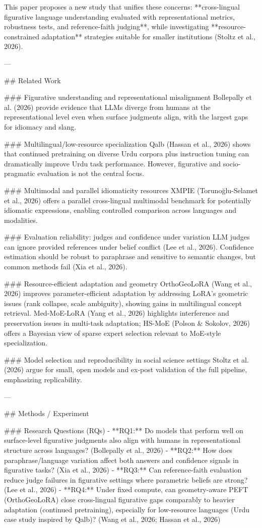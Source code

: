 This paper proposes a new study that unifies these concerns: **cross-lingual figurative language understanding evaluated with representational metrics, robustness tests, and reference-faith judging**, while investigating **resource-constrained adaptation** strategies suitable for smaller institutions (Stoltz et al., 2026).

---

## Related Work  

### Figurative understanding and representational misalignment  
Bollepally et al. (2026) provide evidence that LLMs diverge from humans at the representational level even when surface judgments align, with the largest gaps for idiomacy and slang.

### Multilingual/low-resource specialization  
Qalb (Hassan et al., 2026) shows that continued pretraining on diverse Urdu corpora plus instruction tuning can dramatically improve Urdu task performance. However, figurative and socio-pragmatic evaluation is not the central focus.

### Multimodal and parallel idiomaticity resources  
XMPIE (Torunoğlu-Selamet et al., 2026) offers a parallel cross-lingual multimodal benchmark for potentially idiomatic expressions, enabling controlled comparison across languages and modalities.

### Evaluation reliability: judges and confidence under variation  
LLM judges can ignore provided references under belief conflict (Lee et al., 2026). Confidence estimation should be robust to paraphrase and sensitive to semantic changes, but common methods fail (Xia et al., 2026).

### Resource-efficient adaptation and geometry  
OrthoGeoLoRA (Wang et al., 2026) improves parameter-efficient adaptation by addressing LoRA’s geometric issues (rank collapse, scale ambiguity), showing gains in multilingual concept retrieval. Med-MoE-LoRA (Yang et al., 2026) highlights interference and preservation issues in multi-task adaptation; HS-MoE (Polson & Sokolov, 2026) offers a Bayesian view of sparse expert selection relevant to MoE-style specialization.

### Model selection and reproducibility in social science settings  
Stoltz et al. (2026) argue for small, open models and ex-post validation of the full pipeline, emphasizing replicability.

---

## Methods / Experiment  

### Research Questions (RQs)  
- **RQ1:** Do models that perform well on surface-level figurative judgments also align with humans in representational structure across languages? (Bollepally et al., 2026)  
- **RQ2:** How does paraphrase/language variation affect both answers and confidence signals in figurative tasks? (Xia et al., 2026)  
- **RQ3:** Can reference-faith evaluation reduce judge failures in figurative settings where parametric beliefs are strong? (Lee et al., 2026)  
- **RQ4:** Under fixed compute, can geometry-aware PEFT (OrthoGeoLoRA) close cross-lingual figurative gaps comparably to heavier adaptation (continued pretraining), especially for low-resource languages (Urdu case study inspired by Qalb)? (Wang et al., 2026; Hassan et al., 2026)

